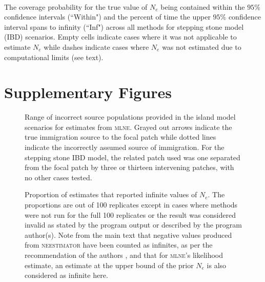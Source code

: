 \begin{landscape}
\begin{table}[h]
\begin{tabular}{ | l| l|| l| l| l| l| l| l| l| l| l| l| l| l| l| l| l| l| l| l| l| l| l| l| l| l| l| l| l| l| }
\end{tabular}
\bigskip{}
{\footnotesize \\ The coverage probability for the true value of $N_e$ being contained within the $95\%$ confidence intervals (``Within") and the percent of time the upper $95\%$ confidence interval spans to infinity (``Inf") across all methods for stepping stone model (IBD) scenarios. Empty cells indicate cases where it was not applicable to estimate $N_e$ while dashes indicate cases where $N_e$ was not estimated due to computational limits (see text).}
\end{table}


\end{landscape}





\section{Supplementary Figures}

\begin{figure}[!ht]
\centering
{}
\caption[Range of incorrect source populations provided in the island model scenarios.]{Range of incorrect source populations provided in the island model scenarios for estimates from \textsc{mlne}. Grayed out arrows indicate the true immigration source to the focal patch while dotted lines indicate the incorrectly assumed source of immigration. For the stepping stone IBD model, the related patch used was one separated from the focal patch by three or thirteen intervening patches, with no other cases tested.}
\label{fig:supp_demog}
\end{figure}


\begin{figure}[ht]
\centering
{}
\caption[Proportion of estimates that reported infinite values of $N_e$.]{Proportion of estimates that reported infinite values of $N_e$. The proportions are out of 100 replicates except in cases where methods were not run for the full 100 replicates or the result was considered invalid as stated by the program output or described by the program author(s). Note from the main text that negative values produced from \textsc{neestimator} have been counted as infinites, as per the recommendation of the authors \citep{Do:2014}, and that for \textsc{mlne}'s likelihood estimate, an estimate at the upper bound of the prior $N_e$ is also considered as infinite here.}
\label{fig:supp_propinf}
\end{figure}


